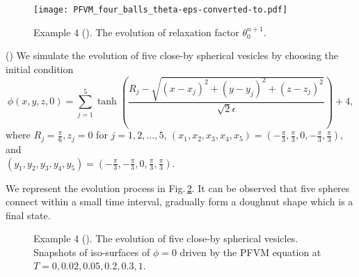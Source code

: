 \documentclass[final,review,onefignum,onetabnum]{siamart190516}
\theoremstyle{plain}
\begin{document}
\begin{figure}[htbp]
\centering
	\texttt{[image: PFVM\_four\_balls\_theta-eps-converted-to.pdf]}
\caption{Example 4 (). The evolution of relaxation factor $\theta_{0}^{n+1}$.}
\label{Fig:PFVM-RESAV1-four-balls-zeta}
\end{figure}


() 
We simulate the evolution of five close-by spherical vesicles by choosing the initial condition %
\begin{equation}
\phi(x, y, z, 0)=\sum_{j=1}^{5} \tanh \left(\frac{R_{j}-\sqrt{\left(x-x_{j}\right)^{2}+\left(y-y_{j}\right)^{2}+\left(z-z_{j}\right)^{2}}}{\sqrt{2} \epsilon}\right)+4,
\end{equation}
where $R_{j}=\frac{\pi}{6}, z_{j}=0$ for $j=1,2, \ldots, 5$,  $\left(x_{1}, x_{2}, x_{3}, x_{4}, x_{5}\right)=\left(-\frac{\pi}{3}, \frac{\pi}{3}, 0, -\frac{\pi}{3}, \frac{\pi}{3}\right)$, and \\
$\left(y_{1}, y_{2}, y_{3}, y_{4}, y_{5}\right)=\left(-\frac{\pi}{3}, -\frac{\pi}{3}, 0, \frac{\pi}{3}, \frac{\pi}{3}\right)$. 

We represent the evolution process in Fig.\,\ref{Fig:PFVM-RESAV1-five-balls}. 
It can be observed that five spheres connect within a small time interval, gradually form a doughnut shape which is a final state.   

\begin{figure}[htbp]
\centering
{} 
\label{Fig:PFVM-RESAV1-five-balls}
\caption{Example 4 (). The evolution of five close-by spherical vesicles. Snapshots of iso-surfaces of $\phi=0$ driven by the PFVM equation at $T=0, 0.02, 0.05, 0.2, 0.3, 1$.}
\end{figure}
\end{document}
